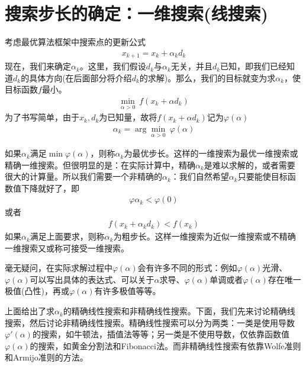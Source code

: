 \section{搜索步长的确定：一维搜索(线搜索)}
    \par
    考虑最优算法框架中搜索点的更新公式
    \begin{align*}
    x_{k+1}=x_k+{\alpha}_k d_k
    \end{align*}
    现在，我们来确定${\alpha}_k$。这里，我们假设$d_k$与${\alpha}_k$无关，并且$d_k$已知，即我们已经知道$d_k$的具体方向(在后面部分将介绍$d_k$的求解)。那么，我们的目标就变为求${\alpha}_k$，使目标函数$f$最小。
    \begin{align*}
    \min \limits_{\alpha >0}\ f(x_k+\alpha d_k)
    \end{align*}
    为了书写简单，由于$x_k,d_k$为已知量，故将$f(x_k+{\alpha} d_k)$记为$\varphi(\alpha)$
    \begin{align*}
    {\alpha}_k=\arg \mathop {\min} \limits_{\alpha >0}\ \varphi(\alpha)
    \end{align*}
    \par
    如果${\alpha}_k$满足$\min \varphi(\alpha)$，则称${\alpha}_k$为最优步长。这样的一维搜索为最优一维搜索或精确一维搜索。但很明显的是：在实际计算中，精确${\alpha}_k$是难以求解的，或者需要很大的计算量。所以我们需要一个非精确的${\alpha}_k$：我们自然希望${\alpha}_k$只要能使目标函数值下降就好了，即
    \begin{align*}
    \varphi{{\alpha}_k}<\varphi(0)
    \end{align*}
    或者
    \begin{align*}
    f(x_k+{\alpha}_k d_k)<f(x_k)
    \end{align*}
    如果${\alpha}_k$满足上面要求，则称${\alpha}_k$为粗步长。这样一维搜索为近似一维搜索或不精确一维搜索又或称可接受一维搜索。
    \par
    毫无疑问，在实际求解过程中$\varphi(\alpha)$会有许多不同的形式：例如$\varphi(\alpha)$光滑、$\varphi(\alpha)$可以写出具体的表达式、可以关于$\alpha $求导、$\varphi(\alpha)$单调或者$\varphi(\alpha)$存在唯一极值(凸性)，再或$\varphi(\alpha)$有许多极值等等。
    \par
    上面给出了求$\alpha_k$的精确线性搜索和非精确线性搜索。下面，我们先来讨论精确线搜索，然后讨论非精确线性搜索。精确线性搜索可以分为两类：一类是使用导数${\varphi}'(\alpha)$的搜索，如牛顿法，插值法等等；另一类是不使用导数，仅依靠函数值$\varphi(\alpha)$的搜索，如黄金分割法和Fibonacci法。而非精确线性搜索有依靠Wolfe准则和Armijo准则的方法。

